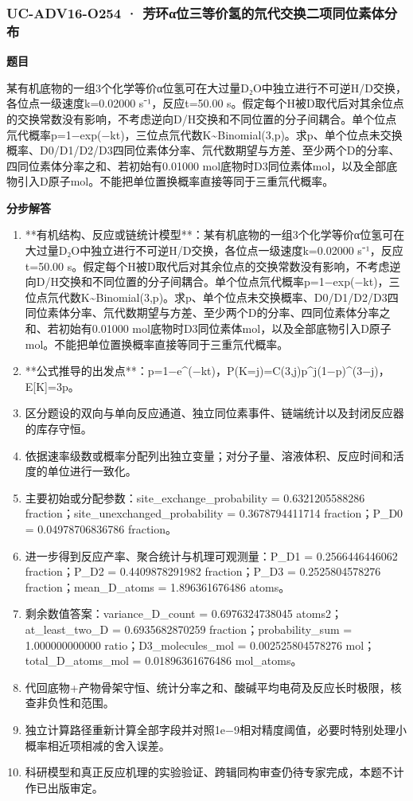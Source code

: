 \documentclass[UTF8,11pt,a4paper]{ctexart}
\begin{document}
\subsubsection*{UC-ADV16-O254 · 芳环α位三等价氢的氘代交换二项同位素体分布}
\noindent\textbf{题目}\par
某有机底物的一组3个化学等价α位氢可在大过量D₂O中独立进行不可逆H/D交换，各位点一级速度k=0.02000 s⁻¹，反应t=50.00 s。假定每个H被D取代后对其余位点的交换常数没有影响，不考虑逆向D/H交换和不同位置的分子间耦合。单个位点氘代概率p=1−exp(−kt)，三位点氘代数K\textasciitilde{}Binomial(3,p)。求p、单个位点未交换概率、D0/D1/D2/D3四同位素体分率、氘代数期望与方差、至少两个D的分率、四同位素体分率之和、若初始有0.01000 mol底物时D3同位素体mol，以及全部底物引入D原子mol。不能把单位置换概率直接等同于三重氘代概率。\par
\medskip\noindent\textbf{分步解答}
\begin{enumerate}
\item **有机结构、反应或链统计模型**：某有机底物的一组3个化学等价α位氢可在大过量D₂O中独立进行不可逆H/D交换，各位点一级速度k=0.02000 s⁻¹，反应t=50.00 s。假定每个H被D取代后对其余位点的交换常数没有影响，不考虑逆向D/H交换和不同位置的分子间耦合。单个位点氘代概率p=1−exp(−kt)，三位点氘代数K\textasciitilde{}Binomial(3,p)。求p、单个位点未交换概率、D0/D1/D2/D3四同位素体分率、氘代数期望与方差、至少两个D的分率、四同位素体分率之和、若初始有0.01000 mol底物时D3同位素体mol，以及全部底物引入D原子mol。不能把单位置换概率直接等同于三重氘代概率。
\item **公式推导的出发点**：p=1−e\textasciicircum{}(−kt)，P(K=j)=C(3,j)p\textasciicircum{}j(1−p)\textasciicircum{}(3−j)，E[K]=3p。
\item 区分题设的双向与单向反应通道、独立同位素事件、链端统计以及封闭反应器的库存守恒。
\item 依据速率级数或概率分配列出独立变量；对分子量、溶液体积、反应时间和活度的单位进行一致化。
\item 主要初始或分配参数：site\_exchange\_probability = 0.6321205588286 fraction；site\_unexchanged\_probability = 0.3678794411714 fraction；P\_D0 = 0.04978706836786 fraction。
\item 进一步得到反应产率、聚合统计与机理可观测量：P\_D1 = 0.2566446446062 fraction；P\_D2 = 0.4409878291982 fraction；P\_D3 = 0.2525804578276 fraction；mean\_D\_atoms = 1.896361676486 atoms。
\item 剩余数值答案：variance\_D\_count = 0.6976324738045 atoms2；at\_least\_two\_D = 0.6935682870259 fraction；probability\_sum = 1.000000000000 ratio；D3\_molecules\_mol = 0.002525804578276 mol；total\_D\_atoms\_mol = 0.01896361676486 mol\_atoms。
\item 代回底物+产物骨架守恒、统计分率之和、酸碱平均电荷及反应长时极限，核查非负性和范围。
\item 独立计算路径重新计算全部字段并对照1e−9相对精度阈值，必要时特别处理小概率相近项相减的舍入误差。
\item 科研模型和真正反应机理的实验验证、跨辑同构审查仍待专家完成，本题不计作已出版审定。
\end{enumerate}
\end{document}
